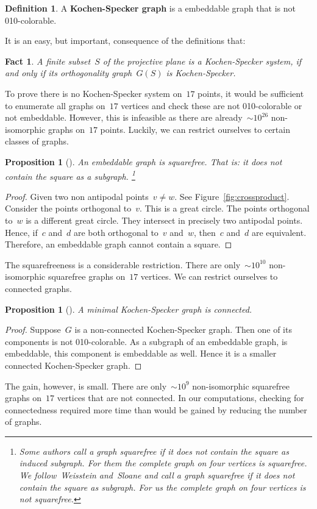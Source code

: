 \documentclass[adraft,copyright,creativecommons]{eptcs}
\newcommand{\keyword}[1]{\textbf{#1}}
\newcounter{main}
\newtheorem{prop}[main]{Proposition}
\newtheorem{fact}[main]{Fact}
\theoremstyle{definition}
\newtheorem{dfn}[main]{Definition}
\theoremstyle{remark}
\begin{document}
\begin{dfn}
A \keyword{Kochen-Specker graph}
is a embeddable graph that is not 010-colorable.
\end{dfn}
It is an easy, but important, consequence of the definitions that:
\begin{fact}
    A finite subset~$S$ of the projective plane
    is a Kochen-Specker system,
    if and only if its orthogonality graph~$G(S)$
    is Kochen-Specker.
\end{fact}
To prove there is no Kochen-Specker system on~$17$ points,
it would be sufficient to enumerate all graphs on~$17$ vertices
and check these are not 010-colorable or not embeddable.
However, this is infeasible as there are
already~${\sim}10^{26}$ non-isomorphic
graphs on~$17$ points.\cite{oeisA000088}
Luckily, we can restrict ourselves to certain classes of graphs.
\begin{prop}[\cite{aow11}]
    An embeddable graph is squarefree.
    That is: it does not contain the square as a subgraph.
    \footnote{Some authors call a graph squarefree if it does not
        contain the square as induced subgraph.
        For them the complete graph on four vertices is squarefree.
        We follow~Weisstein\cite{sf-weisstein} and~Sloane\cite{sf-sloane} and
        call a graph squarefree if it does not
        contain the square as subgraph.
        For us the complete graph on four vertices is not squarefree.}
\end{prop}
\begin{proof}
    Given two non antipodal points~$v\neq w$.
    See Figure~\ref{fig:crossproduct}.
    Consider the points orthogonal to~$v$.
    This is a great circle.
    The points orthogonal to~$w$ is a different great circle.
    They intersect in precisely two antipodal points.
    Hence, if~$c$ and~$d$ are both orthogonal to~$v$ and~$w$,
    then~$c$ and~$d$ are equivalent.
    Therefore, an embeddable graph cannot contain a square.
\end{proof}
The squarefreeness is a considerable restriction.  There are
only~${\sim}10^{10}$ non-isomorphic squarefree graphs on~$17$
vertices.\cite{sf-sloane}
We can restrict ourselves to connected graphs.
\begin{prop}[\cite{aow11}]\label{prop:ks-conn}
    A minimal Kochen-Specker graph is connected.
\end{prop}
\begin{proof}
    Suppose~$G$ is a non-connected Kochen-Specker graph.
    Then one of its components is not 010-colorable.
    As a subgraph of an embeddable graph, is embeddable,
    this component is embeddable as well.
    Hence it is a smaller connected Kochen-Specker graph.
\end{proof}
The gain, however, is small.
There are only~${\sim}10^9$ non-isomorphic squarefree graphs on~$17$
vertices that are not connected.
In our computations, checking for connectedness
required more time than would be gained by reducing the number of graphs.
\end{document}
